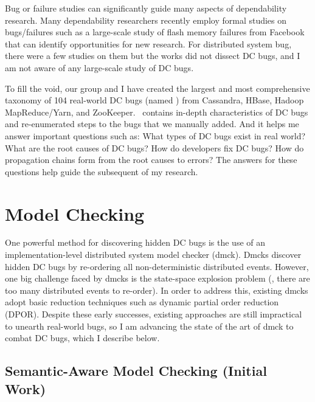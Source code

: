 \documentclass[11pt]{article}
\begin{document}
Bug or failure studies can significantly guide many aspects of dependability
research. Many dependability researchers recently employ formal studies on
bugs/failures such as a large-scale study of flash memory failures from
Facebook that can identify opportunities for new research. For distributed
system bug, there were a few studies on them but the works did not dissect DC
bugs, and I am not aware of any large-scale study of DC bugs. 

To fill the void, our group and I have created the largest and most
comprehensive taxonomy of 104 real-world DC bugs (named \taxdc) from Cassandra,
HBase, Hadoop MapReduce/Yarn, and ZooKeeper. \taxdc\ contains in-depth
characteristics of DC bugs and re-enumerated steps to the bugs that we manually
added. And it helps me answer important questions such as: What types of DC
bugs exist in real world? What are the root causes of DC bugs?  How do
developers fix DC bugs? How do propagation chains form from the root causes to
errors? The answers for these questions help guide the subsequent of my
research.



\section{Model Checking}

One powerful method for discovering hidden DC bugs is the use of an
implementation-level distributed system model checker (dmck). Dmcks discover
hidden DC bugs by re-ordering all non-deterministic distributed events.
However, one big challenge faced by dmcks is the state-space explosion problem
(\ie, there are too many distributed events to re-order). In order to address
this, existing dmcks adopt basic reduction techniques such as dynamic partial
order reduction (DPOR). Despite these early successes, existing approaches are
still impractical to unearth real-world bugs, so I am advancing the state of
the art of dmck to combat DC bugs, which I describe below.

\subsection{Semantic-Aware Model Checking (Initial Work)} 
\end{document}
